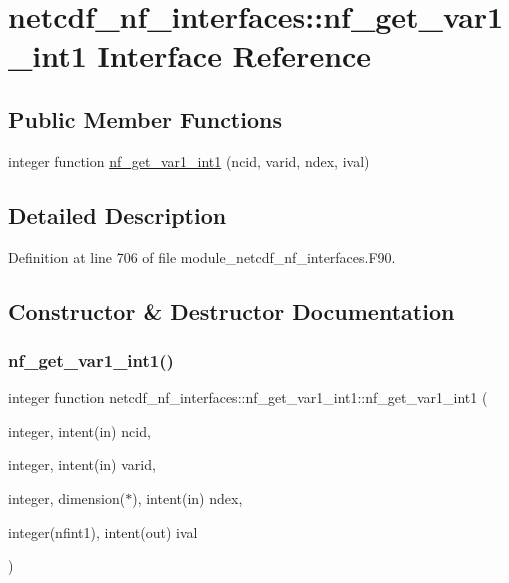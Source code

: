\hypertarget{interfacenetcdf__nf__interfaces_1_1nf__get__var1__int1}{}\section{netcdf\+\_\+nf\+\_\+interfaces\+:\+:nf\+\_\+get\+\_\+var1\+\_\+int1 Interface Reference}
\label{interfacenetcdf__nf__interfaces_1_1nf__get__var1__int1}
\subsection*{Public Member Functions}
\begin{DoxyCompactItemize}
\item 
integer function \hyperlink{interfacenetcdf__nf__interfaces_1_1nf__get__var1__int1_a8f3e422e95024fff445c4885d8942e98}{nf\+\_\+get\+\_\+var1\+\_\+int1} (ncid, varid, ndex, ival)
\end{DoxyCompactItemize}


\subsection{Detailed Description}


Definition at line 706 of file module\+\_\+netcdf\+\_\+nf\+\_\+interfaces.\+F90.



\subsection{Constructor \& Destructor Documentation}
\mbox{\label{interfacenetcdf__nf__interfaces_1_1nf__get__var1__int1_a8f3e422e95024fff445c4885d8942e98}} 
\subsubsection{\texorpdfstring{nf\+\_\+get\+\_\+var1\+\_\+int1()}{nf\_get\_var1\_int1()}}
{\footnotesize\ttfamily integer function netcdf\+\_\+nf\+\_\+interfaces\+::nf\+\_\+get\+\_\+var1\+\_\+int1\+::nf\+\_\+get\+\_\+var1\+\_\+int1 (\begin{DoxyParamCaption}\item[{integer, intent(in)}]{ncid,  }\item[{integer, intent(in)}]{varid,  }\item[{integer, dimension($\ast$), intent(in)}]{ndex,  }\item[{integer(nfint1), intent(out)}]{ival }\end{DoxyParamCaption})}



